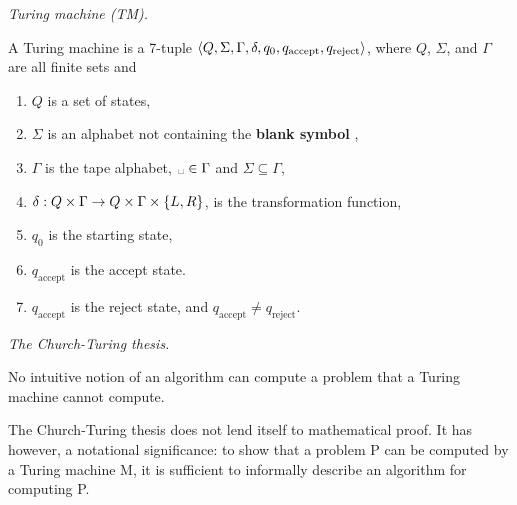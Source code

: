 \begin{definition} \emph{Turing machine (TM).}

A Turing machine is a 7-tuple
$\left\langle{Q,\Sigma,\Gamma,\delta,q_0,q_{\text{accept}},q_{\text{reject}}}\right\rangle$, where $Q$, $\Sigma$,
and $\Gamma$ are all finite sets and

\begin{enumerate}

\item $Q$ is a set of states,

\item $\Sigma$ is an alphabet not containing the \textbf{blank symbol}
\textvisiblespace,

\item $\Gamma$ is the tape alphabet, $\text{\textvisiblespace}\in\Gamma$ and
$\Sigma\subseteq\Gamma$,

\item $\delta:Q\times\Gamma \rightarrow Q\times\Gamma\times\left\{{L,R}\right\}$, is the
transformation function,

\item $q_0$ is the starting state,

\item $q_{\text{accept}}$ is the accept state.

\item $q_{\text{accept}}$ is the reject state, and $q_{\text{accept}}\neq q_{\text{reject}}$.

\end{enumerate}

\end{definition}

\begin{notion} \textit{The Church-Turing thesis.}

No intuitive notion of an algorithm can compute a problem that a Turing
machine cannot compute.

\end{notion}

The Church-Turing thesis does not lend itself to mathematical proof. It has
however, a notational significance: to show that a problem P can be computed
by a Turing machine M, it is sufficient to informally describe an algorithm for
computing P.
